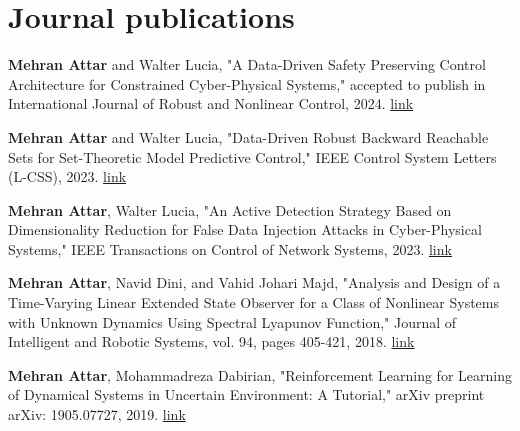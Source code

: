 \documentclass[letterpaper,10.8pt]{article}
\begin{document}
\section{Journal publications}
\begin{enumerate}[label={[\arabic*]}]
\item \textbf{Mehran Attar} and Walter Lucia, "A Data-Driven Safety Preserving Control Architecture for Constrained Cyber-Physical Systems," accepted to publish in International Journal of Robust and Nonlinear Control, 2024. \href{https://arxiv.org/abs/2312.00658}{link}
% 
\item \textbf{Mehran Attar} and Walter Lucia, "Data-Driven Robust Backward Reachable Sets for Set-Theoretic Model Predictive Control," IEEE Control System Letters (L-CSS), 2023. \href{https://ieeexplore.ieee.org/abstract/document/10153604}{link}
% 
  \item \textbf{Mehran Attar}, Walter Lucia, "An Active Detection Strategy Based on Dimensionality Reduction for False Data Injection Attacks in Cyber-Physical Systems," IEEE Transactions on Control of Network Systems, 2023. \href{https://ieeexplore.ieee.org/abstract/document/10042059}{link}
  \item \textbf{Mehran Attar}, Navid Dini, and Vahid Johari Majd, "Analysis and Design of a Time-Varying Linear
Extended State Observer for a Class of Nonlinear Systems with Unknown Dynamics Using Spectral
Lyapunov Function," Journal of Intelligent and Robotic Systems, vol. 94, pages 405-421, 2018. \href{https://link.springer.com/article/10.1007/s10846-018-0935-0}{link}
  \item \textbf{Mehran Attar}, Mohammadreza Dabirian, "Reinforcement Learning for Learning of Dynamical
Systems in Uncertain Environment: A Tutorial," arXiv preprint arXiv: 1905.07727, 2019. \href{https://arxiv.org/abs/1905.07727}{link}
\end{enumerate}
\end{document}
